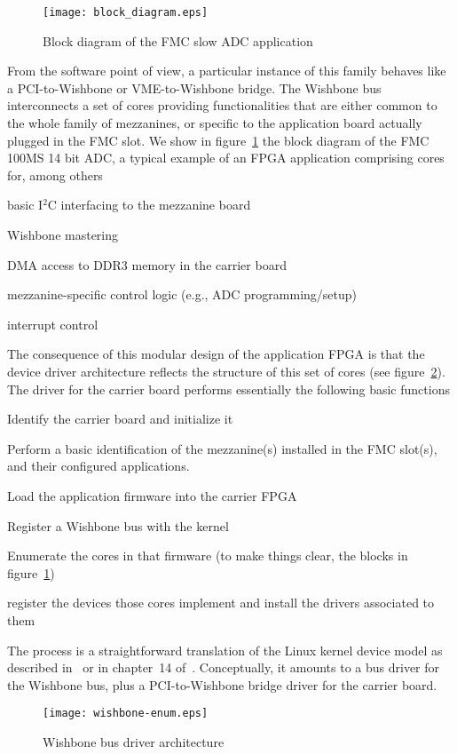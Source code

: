 \documentclass{JAC2003}
\begin{document}
\begin{figure}[tb]
   \centering
   \texttt{[image: block\_diagram.eps]}
   \caption{Block diagram of the FMC slow ADC application}
   \label{slow-adc}
\end{figure}

From the software
point of view, a particular instance of this family behaves like a
PCI-to-Wishbone or VME-to-Wishbone bridge. The Wishbone bus
interconnects a set of cores providing functionalities that are either
common to the whole family of mezzanines, or specific to the application
board actually plugged in the FMC slot. We show in figure~\ref{slow-adc}
the block diagram of the FMC 100MS 14 bit ADC,
a typical example of an FPGA application comprising cores for, among
others
\begin{Itemize}
\item basic I${}^2$C interfacing to the mezzanine board
\item Wishbone mastering
\item DMA access to DDR3 memory in the carrier board
\item mezzanine-specific control logic (e.g., ADC programming/setup)
\item interrupt control
\end{Itemize}
The consequence of this modular design of the application FPGA is that
the device driver architecture reflects the structure of this set of
cores (see figure~\ref{wishbone-enum}). The driver for the carrier board
performs essentially the following basic functions
\begin{Itemize}
\item Identify the carrier board and initialize it
\item Perform a basic identification of the mezzanine(s) installed in
    the FMC slot(s), and their configured applications.
\item Load the application firmware into the carrier FPGA
\item Register a Wishbone bus with the kernel
\item Enumerate the cores in that firmware (to make things clear, the
    blocks in figure~\ref{slow-adc})
\item register the devices those cores implement and install the drivers 
    associated to them
\end{Itemize}
The process is a straightforward translation of the Linux kernel device
model as described in~\cite{device-model} or in chapter~14
of~\cite{rubini}. Conceptually, it amounts to a bus driver for the
Wishbone bus, plus a PCI-to-Wishbone bridge driver for the carrier
board.
\begin{figure}[tb]
   \centering
   \texttt{[image: wishbone-enum.eps]}
   \caption{Wishbone bus driver architecture}
   \label{wishbone-enum}
\end{figure}
\end{document}
